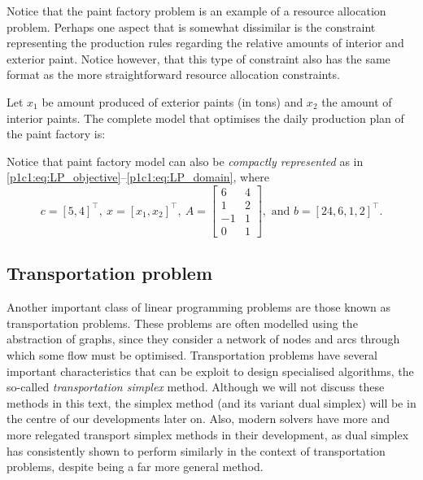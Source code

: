 Notice that the paint factory problem is an example of a resource allocation problem. Perhaps one aspect that is somewhat dissimilar is the constraint representing the production rules regarding the relative amounts of interior and exterior paint. Notice however, that this type of constraint also has the same format as the more straightforward resource allocation constraints.  

Let $x_1$ be amount produced of exterior paints (in tons) and $x_2$ the amount of interior paints. The complete model that optimises the daily production plan of the paint factory is:
%
%
Notice that paint factory model can also be \emph{compactly represented} as in \eqref{p1c1:eq:LP_objective}--\eqref{p1c1:eq:LP_domain}, where
%
\begin{equation*}
	c = [5, 4]^\top, \ x = [x_1, x_2]^\top, \ A = \begin{bmatrix} 6 & 4 \\ 1 & 2 \\ -1 & 1 \\0 & 1 \end{bmatrix}, \text{ and } b = [24, 6, 1, 2]^\top.	
\end{equation*}
%


\subsection{Transportation problem}

Another important class of linear programming problems are those known as transportation problems. These problems are often modelled using the abstraction of graphs, since they consider a network of nodes and arcs through which some flow must be optimised. Transportation problems have several important characteristics that can be exploit to design specialised algorithms, the so-called \emph{transportation simplex} method. Although we will not discuss these methods in this text, the simplex method (and its variant dual simplex) will be in the centre of our developments later on. Also, modern solvers have more and more relegated transport simplex methods in their development, as dual simplex has consistently shown to perform similarly in the context of transportation problems, despite being a far more general method. 

